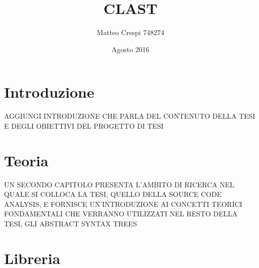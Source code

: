 \documentclass{book}
\title{CLAST}
\author{Matteo Crespi 748274}
\date{Agosto 2016}
\begin{document}
\maketitle

\newpage

\tableofcontents
\listoftables
\listoffigures
\lstlistoflistings

\cleardoublepage

\chapter{Introduzione}

AGGIUNGI INTRODUZIONE CHE PARLA DEL CONTENUTO DELLA TESI E DEGLI OBIETTIVI DEL
PROGETTO DI TESI



\chapter{Teoria}

UN SECONDO CAPITOLO PRESENTA L'AMBITO DI RICERCA NEL QUALE SI COLLOCA LA TESI,
QUELLO DELLA SOURCE CODE ANALYSIS, E FORNISCE UN'INTRODUZIONE AI CONCETTI TEORICI
FONDAMENTALI CHE VERRANNO UTILIZZATI NEL RESTO DELLA TESI, GLI ABSTRACT SYNTAX
TREES






\chapter{Libreria}
\label{library}





\end{document}
